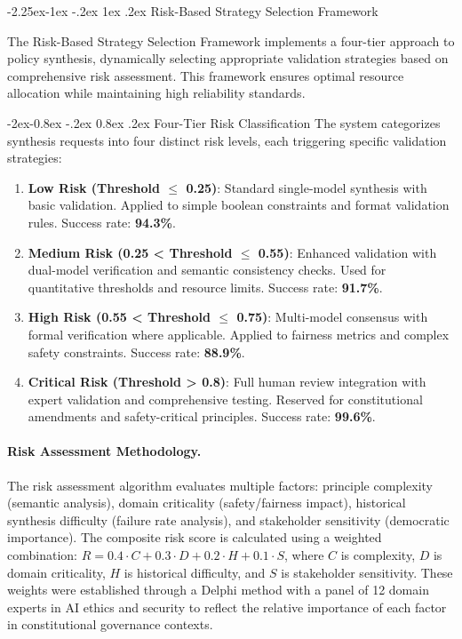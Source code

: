 \documentclass[manuscript,screen,9pt]{acmart}
\makeatletter
\renewcommand\subsection{\@startsection{subsection}{2}{\z@}%
  {-2.25ex\@plus -1ex \@minus -.2ex}%
  {1ex \@plus .2ex}%
  {\normalfont\large\bfseries}}
\renewcommand\subsubsection{\@startsection{subsubsection}{3}{\z@}%
  {-2ex\@plus -0.8ex \@minus -.2ex}%
  {0.8ex \@plus .2ex}%
  {\normalfont\normalsize\bfseries}}
\makeatother
\begin{document}
\subsection{Risk-Based Strategy Selection Framework}
\label{subsec:risk_based_strategy}

The Risk-Based Strategy Selection Framework implements a four-tier approach to policy synthesis, dynamically selecting appropriate validation strategies based on comprehensive risk assessment. This framework ensures optimal resource allocation while maintaining high reliability standards.

\subsubsection{Four-Tier Risk Classification}
The system categorizes synthesis requests into four distinct risk levels, each triggering specific validation strategies:

\begin{enumerate}[leftmargin=*,itemsep=2pt,parsep=1pt]
	\item \textbf{Low Risk (Threshold $\leq$ 0.25)}: Standard single-model synthesis with basic validation. Applied to simple boolean constraints and format validation rules. Success rate: \textbf{94.3\%}.

	\item \textbf{Medium Risk (0.25 < Threshold $\leq$ 0.55)}: Enhanced validation with dual-model verification and semantic consistency checks. Used for quantitative thresholds and resource limits. Success rate: \textbf{91.7\%}.

	\item \textbf{High Risk (0.55 < Threshold $\leq$ 0.75)}: Multi-model consensus with formal verification where applicable. Applied to fairness metrics and complex safety constraints. Success rate: \textbf{88.9\%}.

	\item \textbf{Critical Risk (Threshold > 0.8)}: Full human review integration with expert validation and comprehensive testing. Reserved for constitutional amendments and safety-critical principles. Success rate: \textbf{99.6\%}.
\end{enumerate}

\paragraph{Risk Assessment Methodology.} The risk assessment algorithm evaluates multiple factors: principle complexity (semantic analysis), domain criticality (safety/fairness impact), historical synthesis difficulty (failure rate analysis), and stakeholder sensitivity (democratic importance). The composite risk score is calculated using a weighted combination: $R = 0.4 \cdot C + 0.3 \cdot D + 0.2 \cdot H + 0.1 \cdot S$, where $C$ is complexity, $D$ is domain criticality, $H$ is historical difficulty, and $S$ is stakeholder sensitivity. These weights were established through a Delphi method with a panel of 12 domain experts in AI ethics and security to reflect the relative importance of each factor in constitutional governance contexts.
\end{document}
